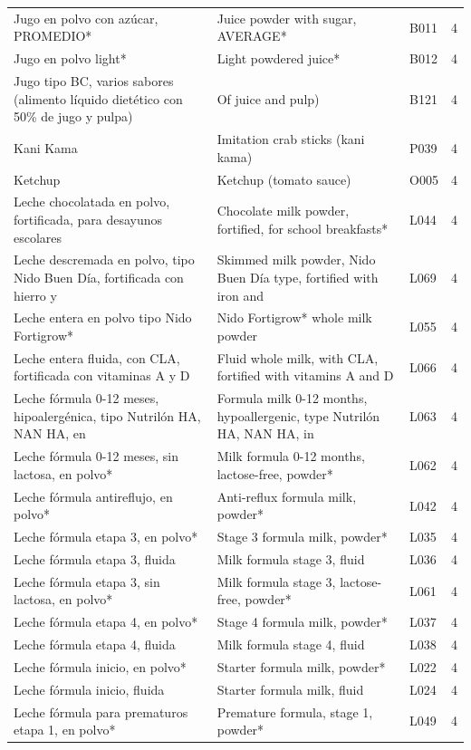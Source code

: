 {\begin{longtable}{p{4.3cm}p{5.5cm}p{1.5cm}p{0.7cm}}
Jugo en polvo con azúcar, PROMEDIO* & Juice powder with sugar, AVERAGE* & B011 & 4\\
Jugo en polvo light* & Light powdered juice* & B012 & 4\\
Jugo tipo BC, varios sabores (alimento líquido dietético con 50\% de jugo y pulpa) & Of juice and pulp) & B121 & 4\\
Kani Kama & Imitation crab sticks (kani kama) & P039 & 4\\
Ketchup & Ketchup (tomato sauce) & O005 & 4\\
Leche chocolatada en polvo, fortificada, para desayunos escolares & Chocolate milk powder, fortified, for school breakfasts* & L044 & 4\\
Leche descremada en polvo, tipo Nido Buen Día, fortificada con hierro y & Skimmed milk powder, Nido Buen Día type, fortified with iron and & L069 & 4\\
Leche entera en polvo tipo Nido Fortigrow* & Nido Fortigrow* whole milk powder & L055 & 4\\
Leche entera fluida, con CLA, fortificada con vitaminas A y D & Fluid whole milk, with CLA, fortified with vitamins A and D & L066 & 4\\
Leche fórmula 0-12 meses, hipoalergénica, tipo Nutrilón HA, NAN HA, en & Formula milk 0-12 months, hypoallergenic, type Nutrilón HA, NAN HA, in & L063 & 4\\
Leche fórmula 0-12 meses, sin lactosa, en polvo* & Milk formula 0-12 months, lactose-free, powder* & L062 & 4\\
Leche fórmula antireflujo, en polvo* & Anti-reflux formula milk, powder* & L042 & 4\\
Leche fórmula etapa 3, en polvo* & Stage 3 formula milk, powder* & L035 & 4\\
Leche fórmula etapa 3, fluida & Milk formula stage 3, fluid & L036 & 4\\
Leche fórmula etapa 3, sin lactosa, en polvo* & Milk formula stage 3, lactose-free, powder* & L061 & 4\\
Leche fórmula etapa 4, en polvo* & Stage 4 formula milk, powder* & L037 & 4\\
Leche fórmula etapa 4, fluida & Milk formula stage 4, fluid & L038 & 4\\
Leche fórmula inicio, en polvo* & Starter formula milk, powder* & L022 & 4\\
Leche fórmula inicio, fluida & Starter formula milk, fluid & L024 & 4\\
Leche fórmula para prematuros etapa 1, en polvo* & Premature formula, stage 1, powder* & L049 & 4\\

\end{longtable}}
